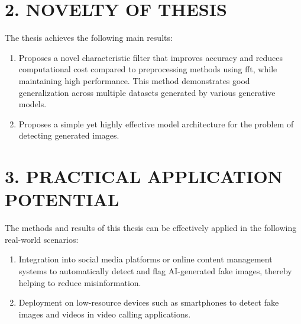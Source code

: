 \section*{2. NOVELTY OF THESIS}
The thesis achieves the following main results:

\begin{enumerate}
	\item Proposes a novel characteristic filter that improves accuracy and reduces computational cost compared to preprocessing methods using \gls{fft}, while maintaining high performance. This method demonstrates good generalization across multiple datasets generated by various generative models.
	
	\item Proposes a simple yet highly effective model architecture for the problem of detecting generated images.
	
	
\end{enumerate}

\section*{3. PRACTICAL APPLICATION POTENTIAL}
The methods and results of this thesis can be effectively applied in the following real-world scenarios:

\begin{enumerate}
	\item Integration into social media platforms or online content management systems to automatically detect and flag AI-generated fake images, thereby helping to reduce misinformation.
	
	\item Deployment on low-resource devices such as smartphones to detect fake images and videos in video calling applications.
\end{enumerate}

%
%
%


